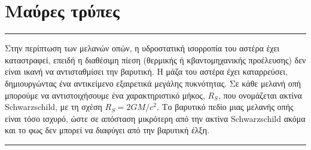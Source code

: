 \section{Μαύρες τρύπες}




{\color{red} \hrule}
Στην περίπτωση των μελανών οπών, η υδροστατική ισορροπία του αστέρα έχει καταστραφεί, επειδή η διαθέσιμη πίεση (θερμικής ή κβαντομηχανικής προέλευσης) δεν είναι ικανή να αντισταθμίσει την βαρυτική. Η μάζα του αστέρα έχει καταρρεύσει, δημιουργώντας ένα αντικείμενο εξαιρετικά μεγάλης πυκνότητας. Σε κάθε μελανή οπή μπορούμε να αντιστοιχήσουμε ένα χαρακτηριστικό μήκος, $R_S$, που ονομάζεται ακτίνα Schwarzschild, με τη σχέση $R_S = 2GM/c^2$. Το βαρυτικό πεδίο μιας μελανής οπής είναι τόσο ισχυρό, ώστε σε απόσταση μικρότερη από την ακτίνα Schwarzschild ακόμα και το φως δεν μπορεί να διαφύγει από την βαρυτική έλξη.\\
{\color{red} \hrule}

